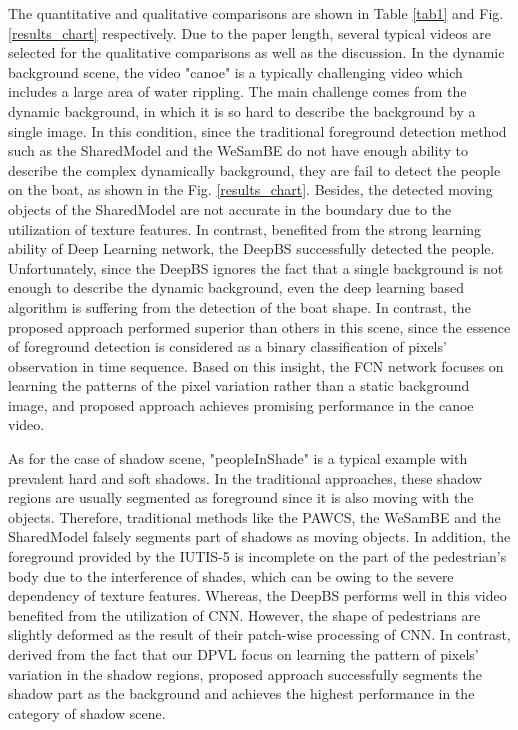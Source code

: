 \documentclass[journal]{IEEEtran}
\newcommand{\reffig}[1]{Fig. \ref{#1}}
\newcommand{\reftab}[1]{Table \ref{#1}}
\begin{document}
The quantitative and qualitative comparisons are shown in \reftab{tab1} and  \reffig{results_chart} respectively. 
Due to the paper length, several typical videos are selected for the qualitative comparisons as well as the discussion. 
In the dynamic background scene, the video "canoe" is a typically challenging video which includes a large area of water rippling. 
The main challenge comes from the dynamic background, in which it is so hard to describe the background by a single image. 
In this condition, since the traditional foreground detection method such as the SharedModel and the WeSamBE do not have enough ability to describe the complex dynamically background, they are fail to detect the people on the boat, as shown in the \reffig{results_chart}. 
Besides, the detected moving objects of the SharedModel are not accurate in the boundary due to the utilization of texture features. 
In contrast, benefited from the strong learning ability of Deep Learning network, the DeepBS successfully detected the people. 
Unfortunately, since the DeepBS ignores the fact that a single background is not enough to describe the dynamic background, even the deep learning based algorithm is suffering from the detection of the boat shape. 
In contrast, the proposed approach performed superior than others in this scene, since the essence of foreground detection is considered as a binary classification of pixels' observation in time sequence. 
Based on this insight, the FCN network focuses on learning the patterns of the pixel variation rather than a static background image, and proposed approach achieves promising performance in the canoe video.



As for the case of shadow scene, "peopleInShade" is a typical example with prevalent hard and soft shadows. 
In the traditional approaches, these shadow regions are usually segmented as foreground since it is also moving with the objects. 
Therefore, traditional methods like the PAWCS, the WeSamBE and the SharedModel falsely segments part of shadows as moving objects. 
In addition, the foreground provided by the IUTIS-5 is incomplete on the part of the pedestrian's body due to the interference of shades, which can be owing to the severe dependency of texture features. 
Whereas, the DeepBS performs well in this video benefited from the utilization of CNN. 
However, the shape of pedestrians are slightly deformed as the result of their patch-wise processing of CNN. 
In contrast, derived from the fact that our DPVL focus on learning the pattern of pixels' variation in the shadow regions, proposed approach successfully segments the shadow part as the background and achieves the highest performance in the category of shadow scene.
\end{document}
